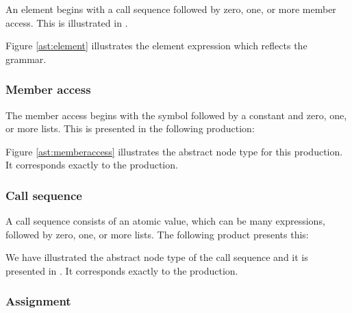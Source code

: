 \begin{ebnf}%
\end{ebnf}%

An element begins with a call sequence followed by zero, one, or more member access. This is illustrated in .



Figure \ref{ast:element} illustrates the element expression which reflects the grammar.

\subsubsection{Member access}

The member access begins with the  symbol followed by a constant and zero, one, or more lists. This is presented in the following production:

\begin{ebnf}%
\end{ebnf}%

Figure \ref{ast:memberaccess} illustrates the abstract node type for this production. It corresponds exactly to the production.



\subsubsection{Call sequence}

A call sequence consists of an atomic value, which can be many expressions, followed by zero, one, or more lists. The following product presents this:

\begin{ebnf}%
\end{ebnf}%

We have illustrated the abstract node type of the call sequence and it is presented in . It corresponds exactly to the  production.



\subsubsection{Assignment}%


